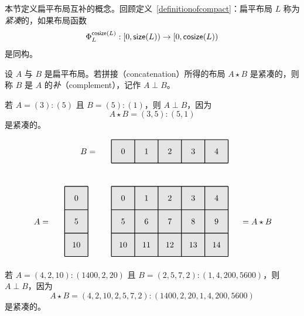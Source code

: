 本节定义扁平布局互补的概念。回顾定义~\ref{definitionofcompact}：扁平布局 $L$ 称为{\it 紧凑}的，如果布局函数
\[\Phi_L^{\mathsf{cosize}(L)}: [0,\mathsf{size}(L)) \to [0,\mathsf{cosize}(L))\]
是同构。

\begin{definition}\label{definitionofcomplement}
设 $A$ 与 $B$ 是扁平布局。若拼接（concatenation）所得的布局 $A \star B$ 是紧凑的，则称 $B$ 是 $A$ 的{\it 补}（complement），记作 $A \perp B$。
\end{definition}


\begin{example}\label{flatcomplementexample1}
若 $A=(3):(5)$ 且 $B= (5):(1)$，则 $A \perp B$，因为
\[
A \star B = (3,5):(5,1)
\]
是紧凑的。

\[
\begin{tikzpicture}[x={(0cm,-1cm)},y={(1cm,0cm)},every node/.style={minimum size=1cm, outer sep=0pt}]

\node[fill=gray!20] at (-2,0) {0};
\node[fill=gray!20] at (-2,1) {1};
\node[fill=gray!20] at (-2,2) {2};
\node[fill=gray!20] at (-2,3) {3};
\node[fill=gray!20] at (-2,4) {4};
\draw[color=black,thick,shift=
{(-0.5,-0.5)}] (-2,0) grid (-1,5);
\node[anchor=east] at (-2,-1) {$B = $};


\node[fill=gray!20] at (0,-2) {0};
\node[fill=gray!20] at (1,-2) {5};
\node[fill=gray!20] at (2,-2) {10};
\draw[color=black,thick,shift=
{(-0.5,-0.5)}] (0,-2) grid (3,-1);
\node[anchor = east] at (1,-3) {$A = $};


\node[fill=gray!20] at (0,0) {0};
\node[fill=gray!20] at (0,1) {1};
\node[fill=gray!20] at (0,2) {2};
\node[fill=gray!20] at (0,3) {3};
\node[fill=gray!20] at (0,4) {4};
\node[fill=gray!20] at (1,0) {5};
\node[fill=gray!20] at (1,1) {6};
\node[fill=gray!20] at (1,2) {7};
\node[fill=gray!20] at (1,3) {8};
\node[fill=gray!20] at (1,4) {9};
\node[fill=gray!20] at (2,0) {10};
\node[fill=gray!20] at (2,1) {11};
\node[fill=gray!20] at (2,2) {12};
\node[fill=gray!20] at (2,3) {13};
\node[fill=gray!20] at (2,4) {14};
\draw[color=black,thick,shift={(-0.5,-0.5)}] (0,0) grid (3,5);

\node[anchor = west] at (1,5) {$= A \star B$};
\end{tikzpicture}
\]
\end{example}

\begin{example}\label{flatcomplementexample2}
    若 $A = (4,2,10):(1400,2,20)$ 且 $B = (2,5,7,2):(1,4,200,5600)$，则 $A \perp B$，因为
    \[
    A \star B = (4,2,10,2,5,7,2) : (1400,2,20,1,4,200,5600)
    \]
    是紧凑的。
\end{example}

